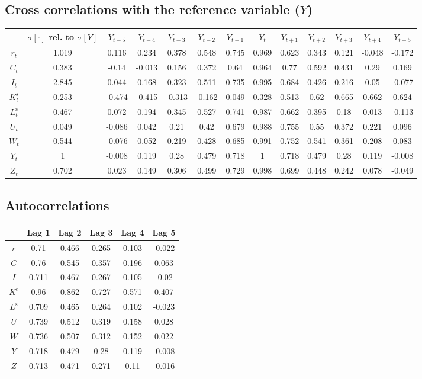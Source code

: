 \subsection{Cross correlations with the reference variable ($Y$)}

\begin{tabular}{c|c|c|c|c|c|c|c|c|c|c|c|c|}
  & $\sigma[\cdot]$ rel. to $\sigma[Y]$ & $Y_{t-5}$ & $Y_{t-4}$ & $Y_{t-3}$ & $Y_{t-2}$ & $Y_{t-1}$ & $Y_{t}$ & $Y_{t+1}$ & $Y_{t+2}$ & $Y_{t+3}$ & $Y_{t+4}$ & $Y_{t+5}$\\
\hline
$r_{t}$ & 1.019 & 0.116 & 0.234 & 0.378 & 0.548 & 0.745 & 0.969 & 0.623 & 0.343 & 0.121 & -0.048 & -0.172 \\
$C_{t}$ & 0.383 & -0.14 & -0.013 & 0.156 & 0.372 & 0.64 & 0.964 & 0.77 & 0.592 & 0.431 & 0.29 & 0.169 \\
$I_{t}$ & 2.845 & 0.044 & 0.168 & 0.323 & 0.511 & 0.735 & 0.995 & 0.684 & 0.426 & 0.216 & 0.05 & -0.077 \\
$K^{\mathrm{s}}_{t}$ & 0.253 & -0.474 & -0.415 & -0.313 & -0.162 & 0.049 & 0.328 & 0.513 & 0.62 & 0.665 & 0.662 & 0.624 \\
$L^{\mathrm{s}}_{t}$ & 0.467 & 0.072 & 0.194 & 0.345 & 0.527 & 0.741 & 0.987 & 0.662 & 0.395 & 0.18 & 0.013 & -0.113 \\
$U_{t}$ & 0.049 & -0.086 & 0.042 & 0.21 & 0.42 & 0.679 & 0.988 & 0.755 & 0.55 & 0.372 & 0.221 & 0.096 \\
$W_{t}$ & 0.544 & -0.076 & 0.052 & 0.219 & 0.428 & 0.685 & 0.991 & 0.752 & 0.541 & 0.361 & 0.208 & 0.083 \\
$Y_{t}$ & 1 & -0.008 & 0.119 & 0.28 & 0.479 & 0.718 & 1 & 0.718 & 0.479 & 0.28 & 0.119 & -0.008 \\
$Z_{t}$ & 0.702 & 0.023 & 0.149 & 0.306 & 0.499 & 0.729 & 0.998 & 0.699 & 0.448 & 0.242 & 0.078 & -0.049 \\
\hline
\end{tabular}


\subsection{Autocorrelations}

\begin{tabular}{c|ccccc|}
  & Lag 1 & Lag 2 & Lag 3 & Lag 4 & Lag 5\\
\hline
$r$ & 0.71 & 0.466 & 0.265 & 0.103 & -0.022 \\
$C$ & 0.76 & 0.545 & 0.357 & 0.196 & 0.063 \\
$I$ & 0.711 & 0.467 & 0.267 & 0.105 & -0.02 \\
$K^{\mathrm{s}}$ & 0.96 & 0.862 & 0.727 & 0.571 & 0.407 \\
$L^{\mathrm{s}}$ & 0.709 & 0.465 & 0.264 & 0.102 & -0.023 \\
$U$ & 0.739 & 0.512 & 0.319 & 0.158 & 0.028 \\
$W$ & 0.736 & 0.507 & 0.312 & 0.152 & 0.022 \\
$Y$ & 0.718 & 0.479 & 0.28 & 0.119 & -0.008 \\
$Z$ & 0.713 & 0.471 & 0.271 & 0.11 & -0.016 \\
\hline
\end{tabular}


